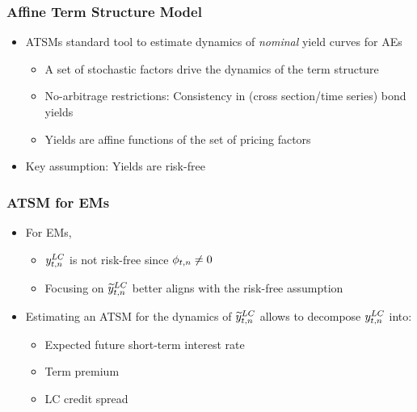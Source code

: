 \documentclass[12pt, aspectratio=169, xcolor=dvipsnames]{beamer} 			         %
\begin{document}
\begin{frame}
	\frametitle{Affine Term Structure Model}
	\begin{itemize}
		\item ATSMs standard tool to estimate dynamics of \textit{nominal} yield curves for AEs
		\begin{itemize}
			\item A set of stochastic factors drive the dynamics of the term structure
			\item No-arbitrage restrictions: Consistency in (cross section/time series) bond yields
			\item Yields are affine functions of the set of pricing factors
		\end{itemize}
		\item Key assumption: Yields are risk-free
	\end{itemize}
\end{frame}

\begin{frame}
	\frametitle{ATSM for EMs}
	\begin{itemize}
		\item For EMs,
		\begin{itemize}
			\item $y_{t,n} ^{LC}$ is not risk-free since $\phi_{t,n} \neq 0$ \citep{DuSchreger:2016a}
			\item Focusing on $\widetilde{y}_{t,n} ^{LC}$ better aligns with the risk-free assumption
		\end{itemize}
		\item Estimating an ATSM for the dynamics of $\widetilde{y}_{t,n} ^{LC}$ allows to decompose $y_{t,n} ^{LC}$ into:
		\begin{itemize}
			\item Expected future short-term interest rate
			\item Term premium
			\item LC credit spread
		\end{itemize}
	\end{itemize}
\end{frame}
\end{document}
